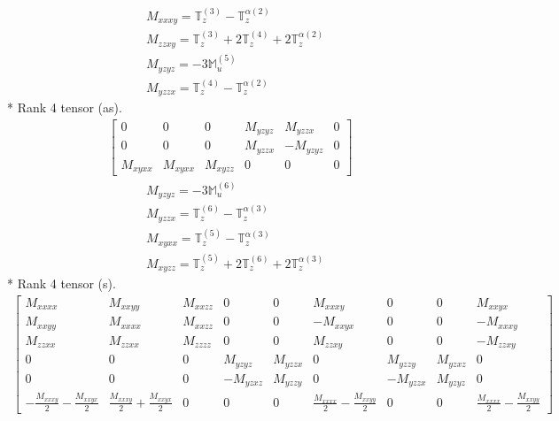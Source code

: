 \documentclass[fleqn,8pt,landscape]{jsarticle}
\begin{document}
\begin{align*}
& M_{xxxy} = \mathbb{T}_{z}^{(3)} - \mathbb{T}_{z}^{\alpha(2)} \\
& M_{zzxy} = \mathbb{T}_{z}^{(3)} + 2 \mathbb{T}_{z}^{(4)} + 2 \mathbb{T}_{z}^{\alpha(2)} \\
& M_{yzyz} = - 3 \mathbb{M}_{u}^{(5)} \\
& M_{yzzx} = \mathbb{T}_{z}^{(4)} - \mathbb{T}_{z}^{\alpha(2)}
\end{align*}
* Rank 4 tensor (as).
\begin{align*}
\begin{bmatrix} 0 & 0 & 0 & M_{yzyz} & M_{yzzx} & 0 \\ 0 & 0 & 0 & M_{yzzx} & - M_{yzyz} & 0 \\ M_{xyxx} & M_{xyxx} & M_{xyzz} & 0 & 0 & 0 \end{bmatrix}
\end{align*}
\begin{align*}
& M_{yzyz} = - 3 \mathbb{M}_{u}^{(6)} \\
& M_{yzzx} = \mathbb{T}_{z}^{(6)} - \mathbb{T}_{z}^{\alpha(3)} \\
& M_{xyxx} = \mathbb{T}_{z}^{(5)} - \mathbb{T}_{z}^{\alpha(3)} \\
& M_{xyzz} = \mathbb{T}_{z}^{(5)} + 2 \mathbb{T}_{z}^{(6)} + 2 \mathbb{T}_{z}^{\alpha(3)}
\end{align*}
* Rank 4 tensor (s).
\begin{align*}
\begin{bmatrix} M_{xxxx} & M_{xxyy} & M_{xxzz} & 0 & 0 & M_{xxxy} & 0 & 0 & M_{xxyx} \\ M_{xxyy} & M_{xxxx} & M_{xxzz} & 0 & 0 & - M_{xxyx} & 0 & 0 & - M_{xxxy} \\ M_{zzxx} & M_{zzxx} & M_{zzzz} & 0 & 0 & M_{zzxy} & 0 & 0 & - M_{zzxy} \\ 0 & 0 & 0 & M_{yzyz} & M_{yzzx} & 0 & M_{yzzy} & M_{yzxz} & 0 \\ 0 & 0 & 0 & - M_{yzxz} & M_{yzzy} & 0 & - M_{yzzx} & M_{yzyz} & 0 \\ - \frac{M_{xxxy}}{2} - \frac{M_{xxyx}}{2} & \frac{M_{xxxy}}{2} + \frac{M_{xxyx}}{2} & 0 & 0 & 0 & \frac{M_{xxxx}}{2} - \frac{M_{xxyy}}{2} & 0 & 0 & \frac{M_{xxxx}}{2} - \frac{M_{xxyy}}{2} \end{bmatrix}
\end{align*}
\end{document}
